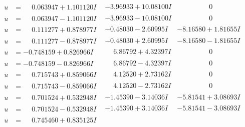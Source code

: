 \documentclass[1p]{elsarticle_modified}
\theoremstyle{definition}
\begin{document}
$$\begin{array}{c|c|c}
 \hline 
\begin{aligned}
u &= \phantom{-}0.063947 + 1.101120 I\end{aligned}
 & -3.96933 + 10.08100 I & \phantom{-0.000000 } 0 \\ \hline\begin{aligned}
u &= \phantom{-}0.063947 - 1.101120 I\end{aligned}
 & -3.96933 - 10.08100 I & \phantom{-0.000000 } 0 \\ \hline\begin{aligned}
u &= \phantom{-}0.111277 + 0.878977 I\end{aligned}
 & -0.48030 - 2.60995 I & -8.16580 + 1.81655 I \\ \hline\begin{aligned}
u &= \phantom{-}0.111277 - 0.878977 I\end{aligned}
 & -0.48030 + 2.60995 I & -8.16580 - 1.81655 I \\ \hline\begin{aligned}
u &= -0.748159 + 0.826966 I\end{aligned}
 & \phantom{-}6.86792 + 4.32397 I & \phantom{-0.000000 } 0 \\ \hline\begin{aligned}
u &= -0.748159 - 0.826966 I\end{aligned}
 & \phantom{-}6.86792 - 4.32397 I & \phantom{-0.000000 } 0 \\ \hline\begin{aligned}
u &= \phantom{-}0.715743 + 0.859066 I\end{aligned}
 & \phantom{-}4.12520 + 2.73162 I & \phantom{-0.000000 } 0 \\ \hline\begin{aligned}
u &= \phantom{-}0.715743 - 0.859066 I\end{aligned}
 & \phantom{-}4.12520 - 2.73162 I & \phantom{-0.000000 } 0 \\ \hline\begin{aligned}
u &= \phantom{-}0.701524 + 0.532948 I\end{aligned}
 & -1.45390 - 3.14036 I & -5.81541 + 3.08693 I \\ \hline\begin{aligned}
u &= \phantom{-}0.701524 - 0.532948 I\end{aligned}
 & -1.45390 + 3.14036 I & -5.81541 - 3.08693 I \\ \hline\begin{aligned}
u &= \phantom{-}0.745460 + 0.835125 I\end{aligned}

\end{array}$$
\end{document}
